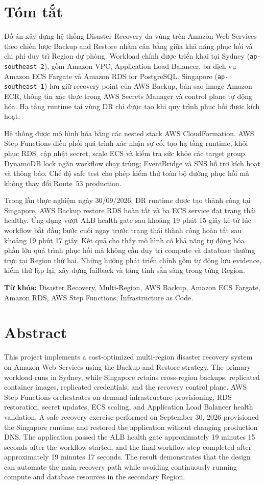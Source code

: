 \chapter*{Tóm tắt}
Đồ án xây dựng hệ thống Disaster Recovery đa vùng trên Amazon Web Services theo chiến lược Backup and Restore nhằm cân bằng giữa khả năng phục hồi và chi phí duy trì Region dự phòng. Workload chính được triển khai tại Sydney (\texttt{ap-southeast-2}), gồm Amazon VPC, Application Load Balancer, ba dịch vụ Amazon ECS Fargate và Amazon RDS for PostgreSQL. Singapore (\texttt{ap-southeast-1}) lưu giữ recovery point của AWS Backup, bản sao image Amazon ECR, thông tin xác thực trong AWS Secrets Manager và control plane tự động hóa. Hạ tầng runtime tại vùng DR chỉ được tạo khi quy trình phục hồi được kích hoạt.

Hệ thống được mô hình hóa bằng các nested stack AWS CloudFormation. AWS Step Functions điều phối quá trình xác nhận sự cố, tạo hạ tầng runtime, khôi phục RDS, cập nhật secret, scale ECS và kiểm tra sức khỏe các target group. DynamoDB lock ngăn workflow chạy trùng; EventBridge và SNS hỗ trợ kích hoạt và thông báo. Chế độ safe test cho phép kiểm thử toàn bộ đường phục hồi mà không thay đổi Route~53 production.

Trong lần thực nghiệm ngày 30/09/2026, DR runtime được tạo thành công tại Singapore, AWS Backup restore RDS hoàn tất và ba ECS service đạt trạng thái healthy. Ứng dụng vượt ALB health gate sau khoảng 19 phút 15 giây kể từ lúc workflow bắt đầu; bước cuối ngay trước trạng thái thành công hoàn tất sau khoảng 19 phút 17 giây. Kết quả cho thấy mô hình có khả năng tự động hóa phần lớn quá trình phục hồi mà không cần duy trì compute và database thường trực tại Region thứ hai. Những hướng phát triển chính gồm tự động lưu evidence, kiểm thử lặp lại, xây dựng failback và tăng tính sẵn sàng trong từng Region.

\vspace{0.5em}
\noindent\textbf{Từ khóa:} Disaster Recovery, Multi-Region, AWS Backup, Amazon ECS Fargate, Amazon RDS, AWS Step Functions, Infrastructure as Code.

\chapter*{Abstract}
This project implements a cost-optimized multi-region disaster recovery system on Amazon Web Services using the Backup and Restore strategy. The primary workload runs in Sydney, while Singapore retains cross-region backups, replicated container images, replicated credentials, and the recovery control plane. AWS Step Functions orchestrates on-demand infrastructure provisioning, RDS restoration, secret updates, ECS scaling, and Application Load Balancer health validation. A safe recovery exercise performed on September 30, 2026 provisioned the Singapore runtime and restored the application without changing production DNS. The application passed the ALB health gate approximately 19 minutes 15 seconds after the workflow started, and the final workflow step completed after approximately 19 minutes 17 seconds. The result demonstrates that the design can automate the main recovery path while avoiding continuously running compute and database resources in the secondary Region.
